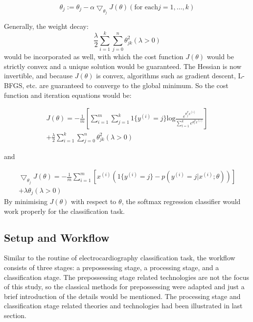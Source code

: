 \documentclass[journal]{IEEEtran}
\begin{document}
\begin{equation}
\theta_j :=\theta_j - \alpha{\bigtriangledown_{\theta_j}J(\theta)}   (\text{for each} j = 1,\ldots,k)
\end{equation}

Generally, the weight decay:
\begin{equation}
\frac{\lambda}{2} \sum_{i=1}^k \sum_{j=0}^n \theta_{jk}^2 (\lambda>0)
\end{equation}
would be incorporated as well, with which the cost function $J(\theta)$ would be strictly convex and a unique solution would be guaranteed. The Hessian is now invertible, and because $J(θ)$ is convex, algorithms such as gradient descent, L-BFGS, etc. are guaranteed to converge to the global minimum.
So the cost function and iteration equations would be:

\begin{equation}
\begin{split}
J(\theta) = -\frac{1}{m}[\sum_{i=1}^m\sum_{j=1}^k1\{y^{(i)}=j\}\text{log}{\frac{e^{\theta_j^Tx^{(i)}}}{\sum_{l=1}^ke^{\theta_l^Tx^{(i)}}}}] \\
+ \frac{\lambda}{2} \sum_{i=1}^k \sum_{j=0}^n \theta_{jk}^2 (\lambda>0)
\end{split}
\end{equation}

and

\begin{equation}
\begin{split}
\bigtriangledown_{\theta_j}J(\theta) = -\frac{1}{m}\sum_{i=1}^m[x^{(i)}(1\{y^{(i)}=j\}-p(y^{(i)}=j|x^{(i)};\theta))] \\
+ \lambda\theta_j  (\lambda>0)
\end{split}
\end{equation}
By minimising $J(\theta)$ with respect to $\theta$, the softmax regression classifier would work properly for the classification task.

\subsection{Setup and Workflow}
Similar to the routine of electrocardiography classification task, the workflow consists of three stages: a prepossessing stage, a processing stage, and a classification stage. The prepossessing stage related technologies are not the focus of this study, so the classical methods for prepossessing were adapted and just a brief introduction of the details would be mentioned. The processing stage and classification stage related theories and technologies had been illustrated in last section. 
\end{document}
